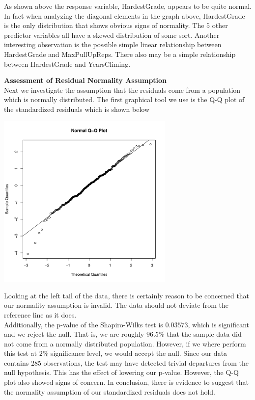 \documentclass[11pt]{amsart}
\begin{document}
As shown above the response variable, HardestGrade, appears to be quite normal.
In fact when analyzing the diagonal elements in the graph above, HardestGrade is the only distribution that shows obvious signs of normality.
The $5$ other predictor variables all have a skewed distribution of some sort.
Another interesting observation is the possible simple linear relationship between HardestGrade and MaxPullUpReps.
There also may be a simple relationship between HardestGrade and YearsCliming.

\newpage
{\bf Assessment of Residual Normality Assumption}\\

Next we investigate the assumption that the residuals come from a population which is normally distributed.
The first graphical tool we use is the Q-Q plot of the standardized residuals which is shown below
\begin{center}
\includegraphics[width=0.65\textwidth]{2.pdf}
\end{center}

Looking at the left tail of the data, there is certainly reason to be concerned that our normality assumption is invalid.
The data should not deviate from the reference line as it does.\\

Additionally, the p-value of the Shapiro-Wilks test is $0.03573$, which is significant and we reject the null.
That is, we are roughly $96.5\%$ that the sample data did not come from a normally distributed population.
However, if we where perform this test at $2\%$ significance level, we would accept the null.
Since our data contains $285$ observations, the test may have detected trivial departures from the null hypothesis.
This has the effect of lowering our p-value. However, the Q-Q plot also showed signs of concern.
In conclusion, there is evidence to suggest that the normality assumption of our standardized residuals does not hold.
\end{document}
